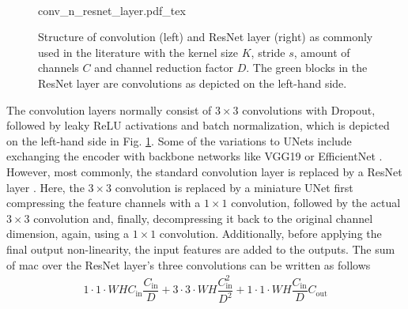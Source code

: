\\
\begin{figure}
	\begin{center}
		{conv_n_resnet_layer.pdf_tex}
		\caption{\label{fig:conv_n_resnet_layer}Structure of convolution (left) and ResNet layer (right) as commonly used in the literature with the kernel size $K$, stride $s$, amount of channels $C$ and channel reduction factor $D$. The green blocks in the ResNet layer are convolutions as depicted on the left-hand side.}
	\end{center}
\end{figure} 
The convolution layers normally consist of $3\times 3$ convolutions with Dropout, followed by leaky ReLU activations and batch normalization, which is depicted on the left-hand side in Fig. \ref{fig:conv_n_resnet_layer}. Some of the variations to UNets include exchanging the encoder with backbone networks like VGG19 \cite{simonyan2014very,wulff2018early} or EfficientNet \cite{tan2019efficientnet,philion2020lift}. However, most commonly, the standard convolution layer is replaced by a ResNet layer \cite{he2016deep,wirges2018evidential,reiher2020sim2real,roddick2020predicting,philion2020lift}. Here, the $3 \times 3$ convolution is replaced by a miniature UNet first compressing the feature channels with a $1\times 1$ convolution, followed by the actual $3 \times 3$ convolution and, finally, decompressing it back to the original channel dimension, again, using a $1 \times 1$ convolution. Additionally, before applying the final output non-linearity, the input features are added to the outputs. The sum of \gls{mac} over the ResNet layer's three convolutions can be written as follows
\begin{align}
	1\cdot 1\cdot WHC_{\text{in}}\dfrac{C_{\text{in}}}{D} + 3\cdot 3\cdot WH\dfrac{C_{\text{in}}^2}{D^2} +1\cdot 1\cdot WH\dfrac{C_{\text{in}}}{D}C_{\text{out}}
\end{align} 

